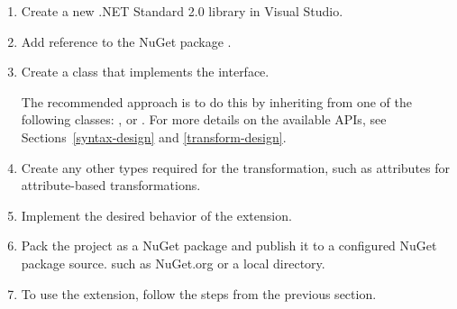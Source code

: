 \begin{enumerate}
\item Create a new .NET Standard 2.0 library in Visual Studio.

\item Add reference to the NuGet package .

\item Create a  class that implements the  interface.

The recommended approach is to do this by inheriting from one of the following  classes: ,  or . For more details on the available \acp{API}, see Sections~\ref{syntax-design} and \ref{transform-design}.

\item Create any other types required for the transformation, such as attributes for attribute-based transformations.

\item Implement the desired behavior of the extension.

\item Pack the project as a NuGet package and publish it to a configured NuGet package source. such as NuGet.org or a local directory.

\item To use the extension, follow the steps from the previous section.
\end{enumerate}
